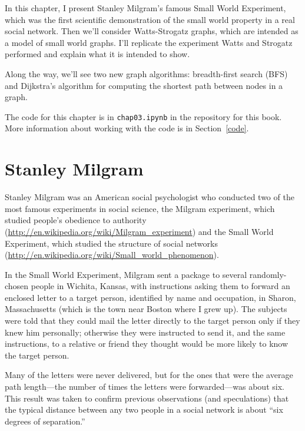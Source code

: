 \documentclass[12pt]{book}
\theoremstyle{exercise}
\begin{document}
In this chapter, I present Stanley Milgram's famous Small World
Experiment, which was the first scientific demonstration of
the small world property in a real social network.  Then we'll
consider Watts-Strogatz graphs, which are intended as a model of
small world graphs.
I'll replicate the experiment Watts and Strogatz performed and
explain what it is intended to show.

Along the way, we'll see two new graph algorithms: breadth-first
search (BFS) and Dijkstra's algorithm for computing the shortest
path between nodes in a graph.

The code for this chapter is in {\tt chap03.ipynb} in the repository
for this book.  More information about working with the code is
in Section~\ref{code}.

\section{Stanley Milgram}

Stanley Milgram was an American social psychologist who conducted
two of the most famous experiments in social science, the
Milgram experiment, which studied people's obedience to authority
(\url{http://en.wikipedia.org/wiki/Milgram_experiment})
and the Small World Experiment, which studied
the structure of social networks
(\url{http://en.wikipedia.org/wiki/Small_world_phenomenon}).

In the Small World Experiment, Milgram sent a package to several
randomly-chosen people in Wichita, Kansas, with instructions asking
them to forward an enclosed letter to a target person, identified by
name and occupation, in Sharon, Massachusetts (which is the town near
Boston where I grew up).  The subjects were told that they could mail
the letter directly to the target person only if they knew him
personally; otherwise they were instructed to send it, and the same
instructions, to a relative or friend they thought would be more
likely to know the target person.

Many of the letters were never delivered, but for the ones that
were the average path length---the number of
times the letters were forwarded---was about six.  This result
was taken to confirm previous observations (and speculations) that
the typical distance between any two people in a social network
is about ``six degrees of separation.''
\end{document}
